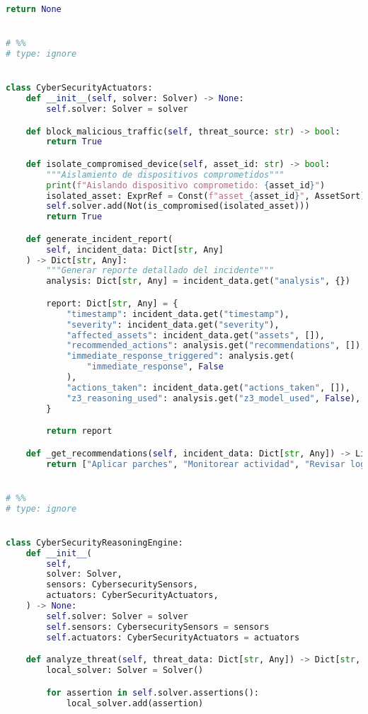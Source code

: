\begin{lstlisting}[language=python, inputencoding=utf8]
        return None


# %%
# type: ignore


class CyberSecurityActuators:
    def __init__(self, solver: Solver) -> None:
        self.solver: Solver = solver

    def block_malicious_traffic(self, threat_source: str) -> bool:
        return True

    def isolate_compromised_device(self, asset_id: str) -> bool:
        """Aislamiento de dispositivos comprometidos"""
        print(f"Aislando dispositivo comprometido: {asset_id}")
        isolated_asset: ExprRef = Const(f"asset_{asset_id}", AssetSort)
        self.solver.add(Not(is_compromised(isolated_asset)))
        return True

    def generate_incident_report(
        self, incident_data: Dict[str, Any]
    ) -> Dict[str, Any]:
        """Generar reporte detallado del incidente"""
        analysis: Dict[str, Any] = incident_data.get("analysis", {})

        report: Dict[str, Any] = {
            "timestamp": incident_data.get("timestamp"),
            "severity": incident_data.get("severity"),
            "affected_assets": incident_data.get("assets", []),
            "recommended_actions": analysis.get("recommendations", []),
            "immediate_response_triggered": analysis.get(
                "immediate_response", False
            ),
            "actions_taken": incident_data.get("actions_taken", []),
            "z3_reasoning_used": analysis.get("z3_model_used", False),
        }

        return report

    def _get_recommendations(self, incident_data: Dict[str, Any]) -> List[str]:
        return ["Aplicar parches", "Monitorear actividad", "Revisar logs"]


# %%
# type: ignore


class CyberSecurityReasoningEngine:
    def __init__(
        self,
        solver: Solver,
        sensors: CybersecuritySensors,
        actuators: CyberSecurityActuators,
    ) -> None:
        self.solver: Solver = solver
        self.sensors: CybersecuritySensors = sensors
        self.actuators: CyberSecurityActuators = actuators

    def analyze_threat(self, threat_data: Dict[str, Any]) -> Dict[str, Any]:
        local_solver: Solver = Solver()

        for assertion in self.solver.assertions():
            local_solver.add(assertion)


\end{lstlisting}
